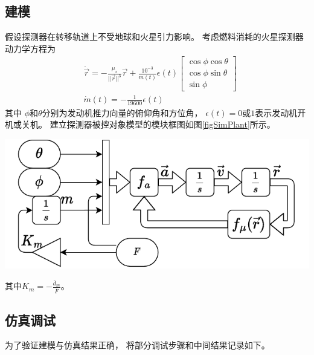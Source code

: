 \subsection{建模}
假设探测器在转移轨道上不受地球和火星引力影响。
考虑燃料消耗的火星探测器动力学方程为
\begin{align*}
    &\ddot{\vec{r}} = -\frac{\mu_s}{||\vec{r}||^3}\vec{r}
    + \frac{10^{-3}}{m(t)}\epsilon(t)
    \left[\begin{matrix}
        \cos\phi\cos\theta \\ \cos\phi\sin\theta \\ \sin\phi
    \end{matrix}\right] \\
    &\dot{m}(t) = -\frac{1}{19600}\epsilon(t)
\end{align*}
其中
$\phi$和$\theta$分别为发动机推力向量的俯仰角和方位角，
$\epsilon(t)=0$或$1$表示发动机开机或关机。
建立探测器被控对象模型的模块框图如图\ref{figSimPlant}所示。
\begin{center}
	\includegraphics[scale=0.8]{plant.pdf}  \\
	\label{figSimPlant}
\end{center}
其中$K_m=-\frac{\bar{d}_m}{\bar{F}}$。

\subsection{仿真调试}
为了验证建模与仿真结果正确，
将部分调试步骤和中间结果记录如下。

